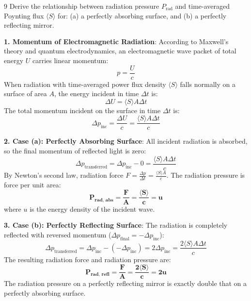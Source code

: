 \begin{theoryq}{9}
Derive the relationship between radiation pressure $P_{\text{rad}}$ and time-averaged Poynting flux $\langle S \rangle$ for: (a) a perfectly absorbing surface, and (b) a perfectly reflecting mirror.
\end{theoryq}
\begin{theorysol}
\textbf{1. Momentum of Electromagnetic Radiation}:
According to Maxwell's theory and quantum electrodynamics, an electromagnetic wave packet of total energy $U$ carries linear momentum:
\begin{equation}
p = \frac{U}{c}
\end{equation}
When radiation with time-averaged power flux density $\langle S \rangle$ falls normally on a surface of area $A$, the energy incident in time $\Delta t$ is:
\begin{equation}
\Delta U = \langle S \rangle A \Delta t
\end{equation}
The total momentum incident on the surface in time $\Delta t$ is:
\begin{equation}
\Delta p_{\text{inc}} = \frac{\Delta U}{c} = \frac{\langle S \rangle A \Delta t}{c}
\end{equation}

\textbf{2. Case (a): Perfectly Absorbing Surface}:
All incident radiation is absorbed, so the final momentum of reflected light is zero:
\begin{equation}
\Delta p_{\text{transferred}} = \Delta p_{\text{inc}} - 0 = \frac{\langle S \rangle A \Delta t}{c}
\end{equation}
By Newton's second law, radiation force $F = \frac{\Delta p}{\Delta t} = \frac{\langle S \rangle A}{c}$.
The radiation pressure is force per unit area:
\begin{equation}
\mathbf{P_{\text{rad, abs}} = \frac{F}{A} = \frac{\langle S \rangle}{c} = u}
\end{equation}
where $u$ is the energy density of the incident wave.

\textbf{3. Case (b): Perfectly Reflecting Surface}:
The radiation is completely reflected with reversed momentum ($\Delta p_{\text{final}} = -\Delta p_{\text{inc}}$):
\begin{equation}
\Delta p_{\text{transferred}} = \Delta p_{\text{inc}} - (-\Delta p_{\text{inc}}) = 2\Delta p_{\text{inc}} = \frac{2\langle S \rangle A \Delta t}{c}
\end{equation}
The resulting radiation force and radiation pressure are:
\begin{equation}
\mathbf{P_{\text{rad, refl}} = \frac{F}{A} = \frac{2\langle S \rangle}{c} = 2u}
\end{equation}
The radiation pressure on a perfectly reflecting mirror is exactly double that on a perfectly absorbing surface.
\end{theorysol}
\vspace{4mm}

